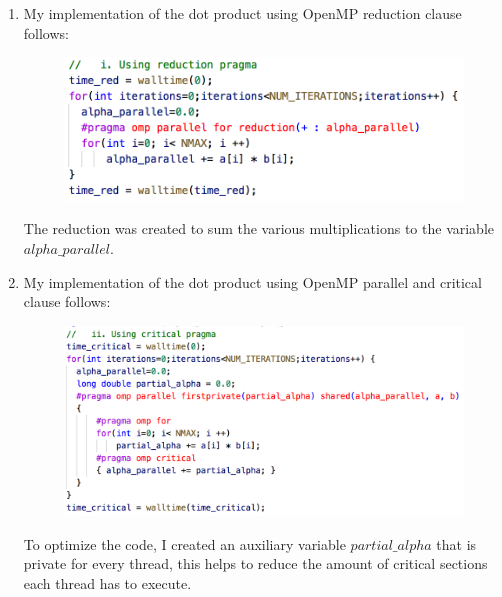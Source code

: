 \documentclass[unicode,11pt,a4paper,oneside,numbers=endperiod,openany]{scrartcl}
\begin{document}
\begin{enumerate}

    \item %

        My implementation of the dot product using OpenMP reduction clause follows:

        \begin{figure}[H]
            \centering
            \includegraphics[width=0.9\linewidth]{reduction}
        \end{figure}

        The reduction was created to sum the various multiplications to the variable $alpha\_parallel$.

    \item %

        My implementation of the dot product using OpenMP parallel and critical clause follows:

        \begin{figure}[H]
            \centering
            \includegraphics[width=0.9\linewidth]{critical}
        \end{figure}

        To optimize the code, I created an auxiliary variable $partial\_alpha$ that is private for every thread, this helps to reduce the amount of critical sections each thread has to execute.
        

\end{enumerate}
\end{document}
